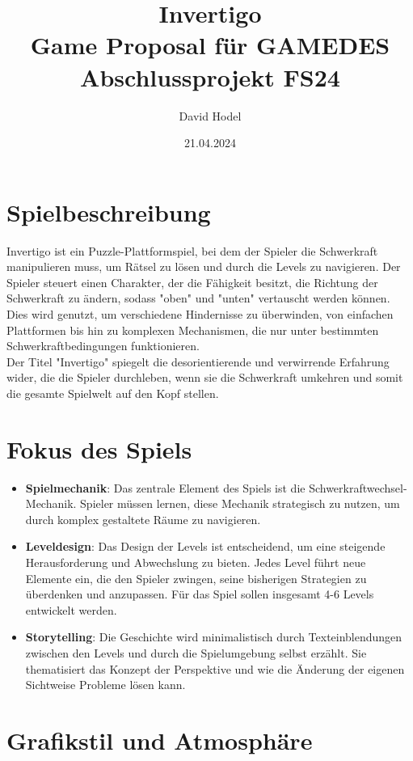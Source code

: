 \documentclass{article}
\title{%
Invertigo \\
\large Game Proposal für GAMEDES \\
  Abschlussprojekt FS24}
\author{David Hodel}
\date{21.04.2024}
\begin{document}
\maketitle
\newpage

\section{Spielbeschreibung}
Invertigo ist ein Puzzle-Plattformspiel, bei dem der Spieler die Schwerkraft manipulieren muss,
um Rätsel zu lösen und durch die Levels zu navigieren. Der Spieler steuert einen Charakter,
der die Fähigkeit besitzt, die Richtung der Schwerkraft zu ändern, sodass "oben" und "unten" vertauscht werden können.
Dies wird genutzt, um verschiedene Hindernisse zu überwinden, von einfachen Plattformen bis hin zu komplexen Mechanismen,
die nur unter bestimmten Schwerkraftbedingungen funktionieren.
\\
Der Titel "Invertigo" spiegelt die desorientierende und verwirrende Erfahrung wider, die die Spieler durchleben,
wenn sie die Schwerkraft umkehren und somit die gesamte Spielwelt auf den Kopf stellen.

\section{Fokus des Spiels}

\begin{itemize}
    \item \textbf{Spielmechanik}: Das zentrale Element des Spiels ist die Schwerkraftwechsel-Mechanik.
    Spieler müssen lernen, diese Mechanik strategisch zu nutzen, um durch komplex gestaltete Räume zu navigieren.
    \item \textbf{Leveldesign}: Das Design der Levels ist entscheidend, um eine steigende Herausforderung und Abwechslung zu bieten.
    Jedes Level führt neue Elemente ein, die den Spieler zwingen, seine bisherigen Strategien zu überdenken und anzupassen.
    Für das Spiel sollen insgesamt 4-6 Levels entwickelt werden.
    \item \textbf{Storytelling}: Die Geschichte wird minimalistisch durch Texteinblendungen zwischen den Levels und durch die Spielumgebung selbst erzählt.
    Sie thematisiert das Konzept der Perspektive und wie die Änderung der eigenen Sichtweise Probleme lösen kann.
\end{itemize}

\section{Grafikstil und Atmosphäre}
\end{document}
